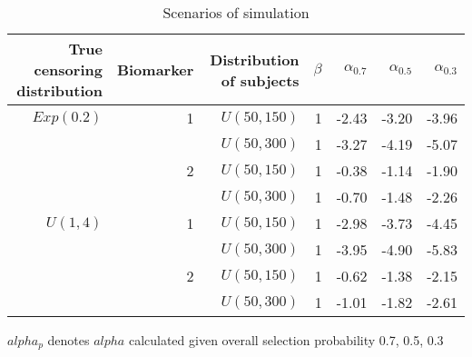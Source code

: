 \begin{table}[!htb]

\caption{\label{tab:set}Scenarios of simulation}
\centering
\begin{threeparttable}
\begin{tabular}[t]{rrrrrrr}
\toprule
True censoring distribution & Biomarker & Distribution of subjects & $\beta$ & $\alpha_{0.7}$ & $\alpha_{0.5}$ & $\alpha_{0.3}$\\
\midrule
$Exp(0.2)$ & 1 & $U(50,150)$ & 1 & -2.43 & -3.20 & -3.96\\
 &  & $U(50,300)$ & 1 & -3.27 & -4.19 & -5.07\\
 & 2 & $U(50,150)$ & 1 & -0.38 & -1.14 & -1.90\\
 &  & $U(50,300)$ & 1 & -0.70 & -1.48 & -2.26\\
\addlinespace
$U(1,4)$ & 1 & $U(50,150)$ & 1 & -2.98 & -3.73 & -4.45\\
 &  & $U(50,300)$ & 1 & -3.95 & -4.90 & -5.83\\
 & 2 & $U(50,150)$ & 1 & -0.62 & -1.38 & -2.15\\
 &  & $U(50,300)$ & 1 & -1.01 & -1.82 & -2.61\\
\bottomrule
\end{tabular}
\begin{tablenotes}
\item 
			$alpha_{p}$ denotes $alpha$ calculated given overall selection probability 0.7, 0.5, 0.3
\end{tablenotes}
\end{threeparttable}
\end{table}
